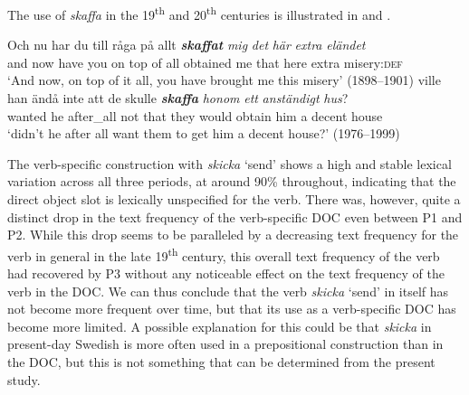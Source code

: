 \documentclass[output=paper]{langscibook}
\begin{document}
\begin{table}
\caption{Frequency measures of the verb-specific DOC with \textit{skaffa} ‘obtain’}
\label{tab:valdeson:18}
\end{table}

The use of \textit{skaffa} in the 19\textsuperscript{th} and 20\textsuperscript{th} centuries is illustrated in  and .


\ea \label{ex:valdeson:28}
\gll Och   nu   har   du   till     råga   på   allt \textbf{\textit{skaffat}} \textit{mig} \textit{det}     \textit{här}   \textit{extra} \textit{eländet}\\
  and     now have   you on   top   of       all   obtained   me  that    here    extra   misery:\textsc{def}\\
\glt `And now, on top of it all, you have brought me this misery’ (1898–1901)
\ex \label{ex:valdeson:29}
\gll ville     han ändå     inte    att    de   skulle \textbf{\textit{skaffa}} \textit{honom} \textit{ett}   \textit{anständigt}   \textit{hus}?\\
  wanted   he   after\_all not     that   they   would   obtain   him a   decent           house\\
\glt `didn’t he after all want them to get him a decent house?’ (1976–1999)
\z


\label{sec:valdeson:5.3.3.6}



The verb-specific construction with \textit{skicka} ‘send’ shows a high and stable lexical variation across all three periods, at around 90\% throughout, indicating that the direct object slot is lexically unspecified for the verb. There was, however, quite a distinct drop in the text frequency of the verb-specific DOC even between P1 and P2. While this drop seems to be paralleled by a decreasing text frequency for the verb in general in the late 19\textsuperscript{th} century, this overall text frequency of the verb had recovered by P3 without any noticeable effect on the text frequency of the verb in the DOC. We can thus conclude that the verb \textit{skicka} ‘send’ in itself has not become more frequent over time, but that its use as a verb-specific DOC has become more limited. A possible explanation for this could be that \textit{skicka} in present-day Swedish is more often used in a prepositional construction than in the DOC, but this is not something that can be determined from the present study.
\end{document}
